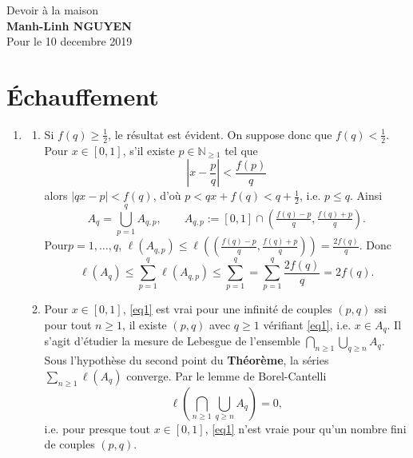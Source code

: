 \documentclass[french]{article}
\theoremstyle{definition}
\newcommand{\tuple}[1]{\left(#1\right)}
\newcommand{\oin}[1]{\left(#1\right)}
\newcommand{\abs}[1]{\left|#1\right|}
\newcommand{\Nbb}{\mathbb{N}}
\begin{document}
	
	
\begin{center}
	{\Large Devoir \`a la maison}\\
	\textbf{Manh-Linh NGUYEN}\\ Pour le  10 decembre 2019
\end{center}
	
\vspace{0.2 cm}
\section{\'Echauffement}
\begin{enumerate}
    \item \label{Partie1}
    \begin{enumerate}
        \item Si $f(q) \ge \frac{1}{2}$, le r\'esultat est \'evident. On suppose donc que $f(q) < \frac{1}{2}$. Pour $x \in [0,1]$, s'il existe $p \in \Nbb_{\ge 1}$ tel que 
        \begin{equation} \label{eq1}
            \abs{x - \frac{p}{q}} < \frac{f(p)}{q}
        \end{equation}
    alors $|qx - p| < f(q)$, d'o\`u $p < qx + f(q) < q + \frac{1}{2}$, i.e. $p \le q$. Ainsi
        $$A_q = \bigcup_{p = 1}^q A_{q,p}, \qquad A_{q,p}:=[0,1] \cap \oin{\tfrac{f(q) - p}{q}, \tfrac{f(q) + p}{q}}.$$
    Pour$p = 1,\ldots,q$, $\ell(A_{q,p}) \le \ell\tuple{\oin{\tfrac{f(q) - p}{q}, \tfrac{f(q) + p}{q}}} = \frac{2f(q)}{q}$. Donc
        \begin{equation} \label{eq2}
            \ell(A_q) \le \sum_{p = 1}^q \ell(A_{q,p}) \le \sum_{p=1}^q  = \sum_{p=1}^q \frac{2f(q)}{q} = 2f(q).
        \end{equation}
    \item Pour $x \in [0,1]$, \eqref{eq1} est vrai pour une infinit\'e de couples $(p,q)$ ssi pour tout $n \ge 1$, il existe $(p,q)$ avec $q \ge 1$ v\'erifiant \eqref{eq1}, i.e. $x \in A_q$. Il s'agit d'\'etudier la mesure de Lebesgue de l'ensemble $\bigcap_{n \ge 1}\bigcup_{q \ge n}A_q$. Sous l'hypoth\`ese du second point du {\bf Th\'eor\`eme}, la s\'eries $\sum_{n \ge 1} \ell(A_q)$ converge. Par le lemme de Borel-Cantelli
        $$\ell\tuple{\bigcap_{n \ge 1} \bigcup_{q \ge n}A_q} = 0,$$
    i.e. pour presque tout $x \in [0,1]$, \eqref{eq1} n'est vraie pour qu'un nombre fini de couples $(p,q)$.
    \end{enumerate}
\end{enumerate}
\end{document}
